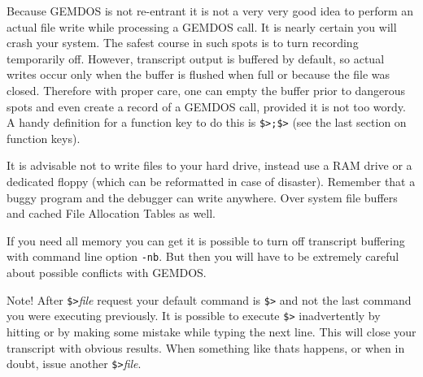Because GEMDOS is not re-entrant it is not a very
very good idea to perform an actual file write while processing
a GEMDOS call.
It is nearly certain you will crash your system.
The safest course in such spots is to turn recording temporarily off.
However, transcript output is buffered by default, so actual
writes occur only when the buffer is flushed when full or because the file was
closed. Therefore with proper care, one can empty the buffer prior to
dangerous spots and even create a record of a GEMDOS call, provided it is not
too wordy. A handy definition for a function key to do this is 
\hbox{\verb|$>;$>|} (see the last section on function keys).

It is advisable not to write files to your hard drive, instead use a RAM drive
or a dedicated floppy (which can be reformatted in case of disaster). Remember
that a buggy program and the debugger can write anywhere. Over system file
buffers and cached File Allocation Tables as well.

If you need all memory you can get it is possible to turn off
transcript buffering with command line option {\tt -nb}.  But then
you will have to be extremely careful about possible conflicts with
GEMDOS.

{\sc Note!}  After \verb|$>|{\it file\/} request your default command
is \verb|$>| and not the last command you were executing previously.
It is possible to execute \verb|$>| inadvertently by hitting 
or by making some mistake while typing the next line.  This will close
your transcript with obvious results.  When something like thats
happens, or when in doubt, issue another \verb|$>|{\it file\/}.
